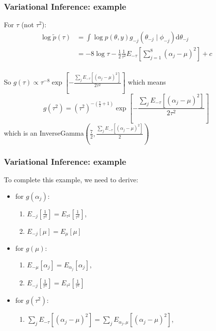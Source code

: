 \documentclass{beamer}
\begin{document}
\begin{frame}[fragile]
\frametitle{Variational Inference: example}


For $\tau$ (not $\tau^2$):
\begin{align*}
\log\tilde{p}(\tau) &= \int\log p(\theta, y)g_{-j}(\theta_{-j} \mid \phi_{-j}) \text{d}\theta_{-j} \\
&= - 8 \log \tau - \frac{1}{2}\frac{1}{\tau^2} E_{-\tau}\left[ \sum_{j=1}^8(\alpha_j - \mu)^2 \right] + c \\
\end{align*}

So $g(\tau) \propto \tau^{-8} \exp\left[-\frac{\sum_jE_{-\tau}[(\alpha_j - \mu)^2]}{2 \tau^2} \right]$ which means $$
g(\tau^2) = (\tau^2)^{-(\frac{7}{2}+1)}\exp\left[-\frac{\sum_jE_{-\tau}[(\alpha_j - \mu)^2]}{2 \tau^2} \right]
$$
which is an InverseGamma$\left( \frac{7}{2}, \frac{\sum_jE_{-\tau}[(\alpha_j - \mu)^2]}{2 }\right)$
\end{frame}

\begin{frame}[fragile]
\frametitle{Variational Inference: example}

To complete this example, we need to derive:
\begin{itemize}
\item for $g(\alpha_j)$: 
  \begin{enumerate}
  \item $E_{-j}\left[\frac{1}{\tau^2}\right] = E_{\tau^2}\left[\frac{1}{\tau^2}\right]$, 
  \item $ E_{-j}[\mu] = E_{\mu}[\mu]$ 
  \end{enumerate}
\item for $g(\mu)$: 
  \begin{enumerate}
  \item $E_{-\mu}[ \alpha_j] = E_{\alpha_j}[ \alpha_j]$, 
  \item $E_{-j}\left[\frac{1}{\tau^2}\right] = E_{\tau^2}\left[\frac{1}{\tau^2}\right]$ 
  \end{enumerate}
\item for $g(\tau^2)$: 
  \begin{enumerate}
  \item $\sum_jE_{-\tau}[(\alpha_j - \mu)^2] = \sum_jE_{\alpha_j,\mu}[(\alpha_j - \mu)^2]$, 
  \end{enumerate}
\end{itemize}

\end{frame}
\end{document}
